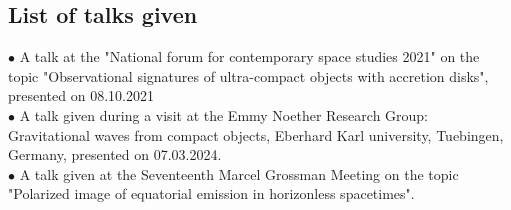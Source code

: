 \documentclass[12pt]{article}
\numberwithin{equation}{section}
\numberwithin{figure}{section}
\begin{document}
	\subsection{List of talks given}
	
	$\bullet$ A talk at the "National forum for contemporary space studies 2021" on the topic "Observational signatures of ultra-compact objects with accretion disks", presented on 08.10.2021\\
	
	\noindent$\bullet$ A talk given during a visit at the Emmy Noether Research Group: Gravitational waves from compact objects, Eberhard Karl university, Tuebingen, Germany, presented on 07.03.2024.\\
	
	\noindent$\bullet$ A talk given at the Seventeenth Marcel Grossman Meeting on the topic "Polarized image of equatorial emission in horizonless spacetimes".
	
	\newpage
	
	
	
\end{document}
